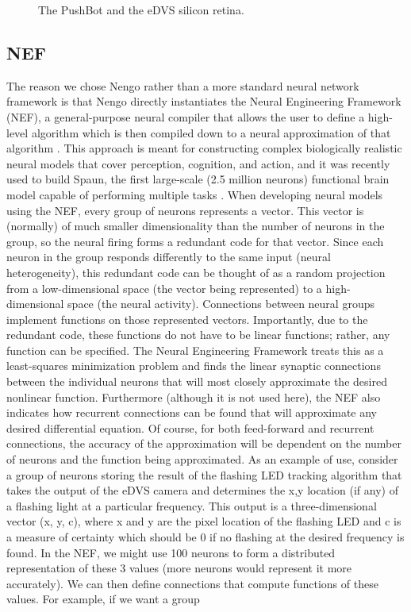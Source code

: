 \documentclass[conference]{IEEEtran}
\begin{document}
\begin{figure}[!t]
\centering
\caption{The PushBot and the eDVS silicon retina.}
\label{fig_sim}
\end{figure}

\subsection{NEF}
The reason we chose Nengo rather than a more standard neural network framework is that Nengo \cite{bekolay_nengo2014} directly instantiates the Neural Engineering Framework (NEF), a general-purpose neural compiler that allows the user to define a high-level algorithm which is then compiled down to a neural approximation of that algorithm \cite{eliasmith2004neural}. This approach is meant for constructing complex biologically realistic neural models that cover perception, cognition, and action, and it was recently used to build Spaun, the first large-scale (2.5 million neurons) functional brain model capable of performing multiple tasks  \cite{eliasmith_largescale_2012}. When developing neural models using the NEF, every group of neurons represents a vector. This vector is (normally) of much smaller dimensionality than the number of neurons in the group, so the neural firing forms a redundant code for that vector. Since each neuron in the group responds differently to the same input (neural heterogeneity), this redundant code can be thought of as a random projection from a low-dimensional space (the vector being represented) to a high-dimensional space (the neural activity). Connections between neural groups implement functions on those represented vectors. Importantly, due to the redundant code, these functions do not have to be linear functions; rather, any function can be specified. The Neural Engineering Framework treats this as a least-squares minimization problem and finds the linear synaptic connections between the individual neurons that will most closely approximate the desired nonlinear function. Furthermore (although it is not used here), the NEF also indicates how recurrent connections can be found that will approximate any desired differential equation. Of course,
for both feed-forward and recurrent connections, the accuracy of the approximation will be dependent on the number of neurons and the function being approximated. As an example of use, consider a group of neurons storing the result of the flashing LED tracking algorithm that takes the output of the eDVS camera and determines the x,y location (if any) of a flashing light at a particular frequency. This output is a three-dimensional vector (x, y, c), where x and y are the pixel location of the flashing LED and c is a measure of certainty which should be 0 if no flashing at the desired frequency is found. In the NEF, we might use 100 neurons to form a distributed representation of these 3 values (more neurons would represent it more accurately). We can then define connections that compute functions of these values. For example, if we want a group
\end{document}
